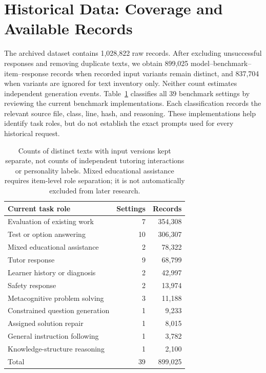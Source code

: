 \section{Historical Data: Coverage and Available Records}
\label{app:archive-scope}

The archived dataset contains 1,028,822 raw records. After excluding unsuccessful responses and removing duplicate texts, we obtain 899,025 model--benchmark--item--response records when
recorded input variants remain distinct, and 837,704 when variants are ignored
for text inventory only. Neither count estimates independent generation events.
Table~\ref{tab:archive-roles} classifies all 39 benchmark settings by reviewing the current benchmark implementations. Each classification
records the relevant source file, class, line, hash, and reasoning. These
implementations help identify task roles, but do not establish the exact
prompts used for every historical request.

\begin{table}[ht]
\centering\small
\begin{tabular}{lrr}
\toprule
Current task role & Settings & Records\\
\midrule
Evaluation of existing work & 7 & 354,308\\
Test or option answering & 10 & 306,307\\
Mixed educational assistance & 2 & 78,322\\
Tutor response & 9 & 68,799\\
Learner history or diagnosis & 2 & 42,997\\
Safety response & 2 & 13,974\\
Metacognitive problem solving & 3 & 11,188\\
Constrained question generation & 1 & 9,233\\
Assigned solution repair & 1 & 8,015\\
General instruction following & 1 & 3,782\\
Knowledge-structure reasoning & 1 & 2,100\\
\midrule
Total & 39 & 899,025\\
\bottomrule
\end{tabular}
\caption{Counts of distinct texts with input versions kept separate, not counts of
independent tutoring interactions or personality labels. Mixed educational assistance requires item-level
role separation; it is not automatically excluded from later research.}
\label{tab:archive-roles}
\end{table}

